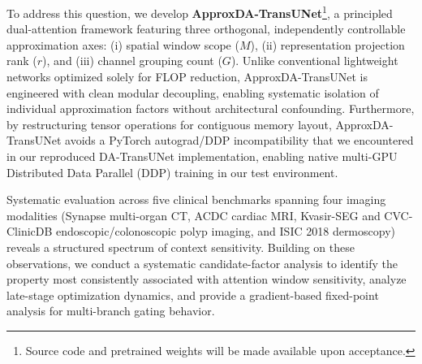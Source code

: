 To address this question, we develop \textbf{ApproxDA-TransUNet}\footnote{Source code and pretrained weights will be made available upon acceptance.}, a principled dual-attention framework featuring three orthogonal, independently controllable approximation axes: (i) spatial window scope ($M$), (ii) representation projection rank ($r$), and (iii) channel grouping count ($G$). Unlike conventional lightweight networks optimized solely for FLOP reduction, ApproxDA-TransUNet is engineered with clean modular decoupling, enabling systematic isolation of individual approximation factors without architectural confounding. Furthermore, by restructuring tensor operations for contiguous memory layout, ApproxDA-TransUNet avoids a PyTorch autograd/DDP incompatibility that we encountered in our reproduced DA-TransUNet implementation, enabling native multi-GPU Distributed Data Parallel (DDP) training in our test environment.

Systematic evaluation across five clinical benchmarks spanning four imaging modalities (Synapse multi-organ CT, ACDC cardiac MRI, Kvasir-SEG and CVC-ClinicDB endoscopic/colonoscopic polyp imaging, and ISIC 2018 dermoscopy) reveals a structured spectrum of context sensitivity. Building on these observations, we conduct a systematic candidate-factor analysis to identify the property most consistently associated with attention window sensitivity, analyze late-stage optimization dynamics, and provide a gradient-based fixed-point analysis for multi-branch gating behavior.


